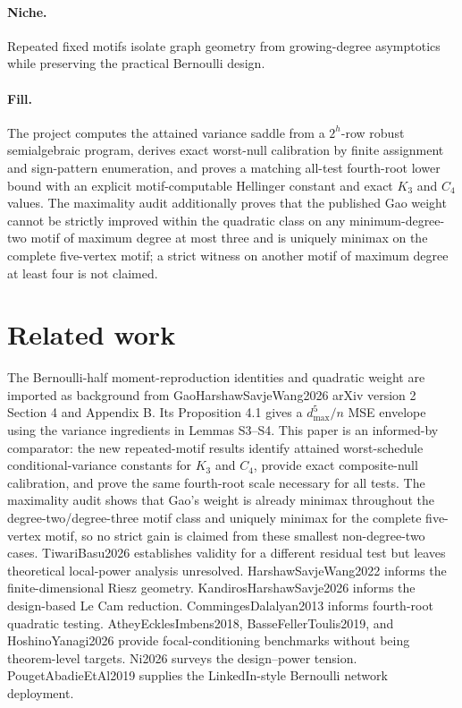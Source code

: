 \documentclass{article}
\begin{document}
\paragraph{Niche.} Repeated fixed motifs isolate graph geometry from growing-degree asymptotics while preserving the practical Bernoulli design.

\paragraph{Fill.} The project computes the attained variance saddle from a \(2^h\)-row robust semialgebraic program, derives exact worst-null calibration by finite assignment and sign-pattern enumeration, and proves a matching all-test fourth-root lower bound with an explicit motif-computable Hellinger constant and exact \(K_3\) and \(C_4\) values. The maximality audit additionally proves that the published Gao weight cannot be strictly improved within the quadratic class on any minimum-degree-two motif of maximum degree at most three and is uniquely minimax on the complete five-vertex motif; a strict witness on another motif of maximum degree at least four is not claimed.

\section{Related work}

The Bernoulli-half moment-reproduction identities and quadratic weight are imported as background from GaoHarshawSavjeWang2026 arXiv version 2 Section 4 and Appendix B. Its Proposition 4.1 gives a \(d_{\max}^5/n\) MSE envelope using the variance ingredients in Lemmas S3--S4. This paper is an informed-by comparator: the new repeated-motif results identify attained worst-schedule conditional-variance constants for \(K_3\) and \(C_4\), provide exact composite-null calibration, and prove the same fourth-root scale necessary for all tests. The maximality audit shows that Gao's weight is already minimax throughout the degree-two/degree-three motif class and uniquely minimax for the complete five-vertex motif, so no strict gain is claimed from these smallest non-degree-two cases. TiwariBasu2026 establishes validity for a different residual test but leaves theoretical local-power analysis unresolved. HarshawSavjeWang2022 informs the finite-dimensional Riesz geometry. KandirosHarshawSavje2026 informs the design-based Le Cam reduction. CommingesDalalyan2013 informs fourth-root quadratic testing. AtheyEcklesImbens2018, BasseFellerToulis2019, and HoshinoYanagi2026 provide focal-conditioning benchmarks without being theorem-level targets. Ni2026 surveys the design--power tension. PougetAbadieEtAl2019 supplies the LinkedIn-style Bernoulli network deployment.
\end{document}
